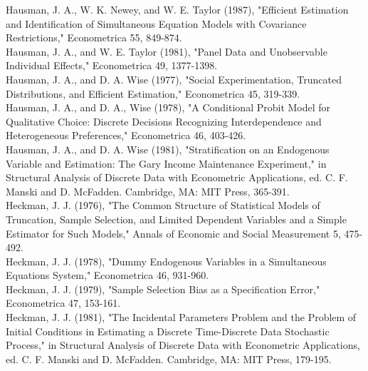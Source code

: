 \documentclass[10pt]{article}
\begin{document}
Hausman, J. A., W. K. Newey, and W. E. Taylor (1987), "Efficient Estimation and Identification of Simultaneous Equation Models with Covariance Restrictions," Econometrica 55, 849-874.\\
Hausman, J. A., and W. E. Taylor (1981), "Panel Data and Unobservable Individual Effects," Econometrica 49, 1377-1398.\\
Hausman, J. A., and D. A. Wise (1977), "Social Experimentation, Truncated Distributions, and Efficient Estimation," Econometrica 45, 319-339.\\
Hausman, J. A., and D. A., Wise (1978), "A Conditional Probit Model for Qualitative Choice: Discrete Decisions Recognizing Interdependence and Heterogeneous Preferences," Econometrica 46, 403-426.\\
Hausman, J. A., and D. A. Wise (1981), "Stratification on an Endogenous Variable and Estimation: The Gary Income Maintenance Experiment," in Structural Analysis of Discrete Data with Econometric Applications, ed. C. F. Manski and D. McFadden. Cambridge, MA: MIT Press, 365-391.\\
Heckman, J. J. (1976), "The Common Structure of Statistical Models of Truncation, Sample Selection, and Limited Dependent Variables and a Simple Estimator for Such Models," Annals of Economic and Social Measurement 5, 475-492.\\
Heckman, J. J. (1978), "Dummy Endogenous Variables in a Simultaneous Equations System," Econometrica 46, 931-960.\\
Heckman, J. J. (1979), "Sample Selection Bias as a Specification Error," Econometrica 47, 153-161.\\
Heckman, J. J. (1981), "The Incidental Parameters Problem and the Problem of Initial Conditions in Estimating a Discrete Time-Discrete Data Stochastic Process," in Structural Analysis of Discrete Data with Econometric Applications, ed. C. F. Manski and D. McFadden. Cambridge, MA: MIT Press, 179-195.
\end{document}
